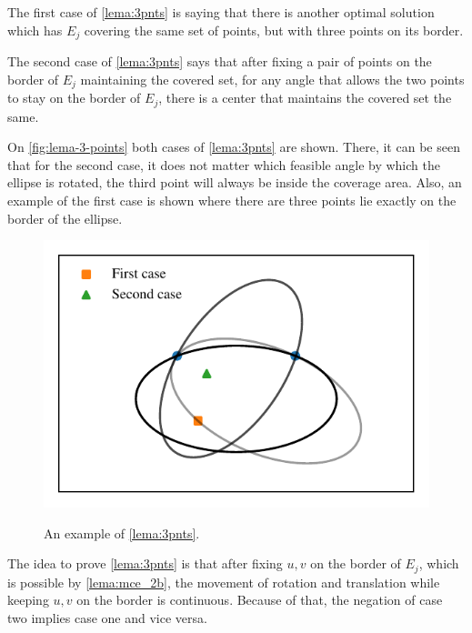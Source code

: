 The first case of \autoref{lema:3pnts} is saying that there is another optimal solution which has $E_j$ covering the same set of points, but with three points on its border. 

The second case of \autoref{lema:3pnts} says that after fixing a pair of points on the border of $E_j$ maintaining the covered set, for any angle that allows the two points to stay on the border of $E_j$, there is a center that maintains the covered set the same.

On \autoref{fig:lema-3-points} both cases of \autoref{lema:3pnts} are shown. There, it can be seen that for the second case, it does not matter which feasible angle by which the ellipse is rotated, the third point will always be inside the coverage area. Also, an example of the first case is shown where there are three points lie exactly on the border of the ellipse.

\begin{figure}
	\centering
	\caption{An example of \autoref{lema:3pnts}.}
	\includegraphics[scale=.8]{tex/figures/scripts/lema-3-points}
	\fautor
	\label{fig:lema-3-points}
\end{figure}

The idea to prove \autoref{lema:3pnts} is that after fixing $u, v$ on the border of $E_j$, which is possible by \autoref{lema:mce_2b}, the movement of rotation and translation while keeping $u, v$ on the border is continuous. Because of that, the negation of case two implies case one and vice versa.


